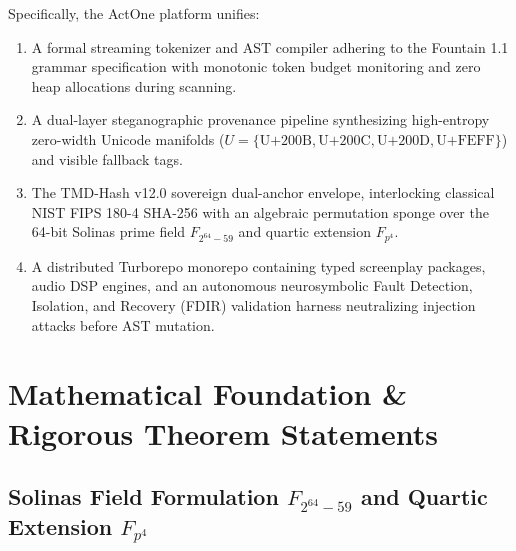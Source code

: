 \documentclass[11pt,a4paper,reqno]{article}
\def\mathcal#1{#1}%
\def\mathbb#1{#1}%
\theoremstyle{plain}
\theoremstyle{definition}
\theoremstyle{remark}
\numberwithin{equation}{section}
\begin{document}
Specifically, the ActOne platform unifies:
\begin{enumerate}[leftmargin=2.0em, itemsep=0.3em]
    \item A formal streaming tokenizer and AST compiler adhering to the Fountain 1.1 grammar specification with monotonic token budget monitoring and zero heap allocations during scanning.
    \item A dual-layer steganographic provenance pipeline synthesizing high-entropy zero-width Unicode manifolds ($\mathcal{U} = \{\text{U+200B}, \text{U+200C}, \text{U+200D}, \text{U+FEFF}\}$) and visible fallback tags.
    \item The TMD-Hash v12.0 sovereign dual-anchor envelope, interlocking classical NIST FIPS 180-4 SHA-256 \cite{fips1804} with an algebraic permutation sponge over the 64-bit Solinas prime field $\mathbb{F}_{2^{64}-59}$ and quartic extension $\mathbb{F}_{p^4}$.
    \item A distributed Turborepo monorepo containing typed screenplay packages, audio DSP engines, and an autonomous neurosymbolic Fault Detection, Isolation, and Recovery (FDIR) validation harness neutralizing injection attacks before AST mutation.
\end{enumerate}

\section{\texorpdfstring{Mathematical Foundation \& Rigorous Theorem Statements}{Mathematical Foundation and Rigorous Theorem Statements}}
\label{sec:math}

\subsection{\texorpdfstring{Solinas Field Formulation $\mathbb{F}_{2^{64}-59}$ and Quartic Extension $\mathbb{F}_{p^4}$}{Solinas Field Formulation F(2^64-59) and Quartic Extension F(p^4)}}
\end{document}
